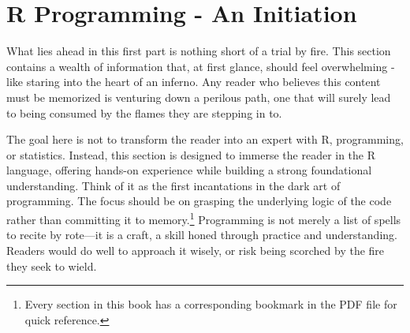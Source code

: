 \part{R Programming - An Initiation}

What lies ahead in this first part is nothing short of a trial by fire. This section contains a wealth of information that, at first glance, should feel overwhelming - like staring into the heart of an inferno. Any reader who believes this content must be memorized is venturing down a perilous path, one that will surely lead to being consumed by the flames they are stepping in to.

The goal here is not to transform the reader into an expert with R, programming, or statistics. Instead, this section is designed to immerse the reader in the R language, offering hands-on experience while building a strong foundational understanding. Think of it as the first incantations in the dark art of programming. The focus should be on grasping the underlying logic of the code rather than committing it to memory.\footnote{Every section in this book has a corresponding bookmark in the PDF file for quick reference.} Programming is not merely a list of spells to recite by rote—it is a craft, a skill honed through practice and understanding. Readers would do well to approach it wisely, or risk being scorched by the fire they seek to wield.
